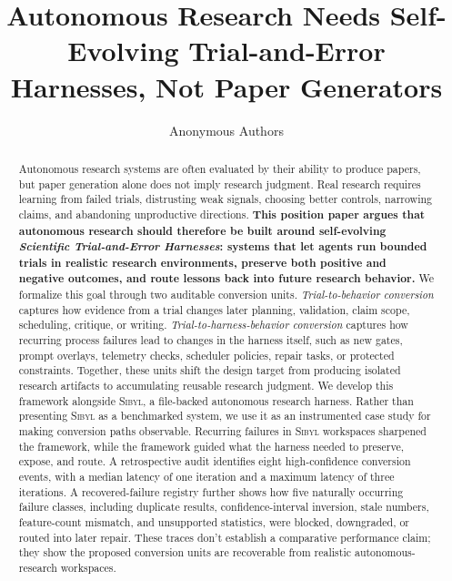 \documentclass{article}
\title{Autonomous Research Needs Self-Evolving Trial-and-Error Harnesses, Not Paper Generators}
\author{Anonymous Authors}
\newcommand{\sibyl}{\textsc{Sibyl}}
\begin{document}
\maketitle

\begin{abstract}
Autonomous research systems are often evaluated by their ability to produce papers, but paper generation alone does not imply research judgment. Real research requires learning from failed trials, distrusting weak signals, choosing better controls, narrowing claims, and abandoning unproductive directions. \textbf{This position paper argues that autonomous research should therefore be built around self-evolving \emph{Scientific Trial-and-Error Harnesses}: systems that let agents run bounded trials in realistic research environments, preserve both positive and negative outcomes, and route lessons back into future research behavior.}
We formalize this goal through two auditable conversion units. \emph{Trial-to-behavior conversion} captures how evidence from a trial changes later planning, validation, claim scope, scheduling, critique, or writing. \emph{Trial-to-harness-behavior conversion} captures how recurring process failures lead to changes in the harness itself, such as new gates, prompt overlays, telemetry checks, scheduler policies, repair tasks, or protected constraints. Together, these units shift the design target from producing isolated research artifacts to accumulating reusable research judgment.
We develop this framework alongside \sibyl{}, a file-backed autonomous research harness. Rather than presenting \sibyl{} as a benchmarked system, we use it as an instrumented case study for making conversion paths observable. Recurring failures in \sibyl{} workspaces sharpened the framework, while the framework guided what the harness needed to preserve, expose, and route. A retrospective audit identifies eight high-confidence conversion events, with a median latency of one iteration and a maximum latency of three iterations. A recovered-failure registry further shows how five naturally occurring failure classes, including duplicate results, confidence-interval inversion, stale numbers, feature-count mismatch, and unsupported statistics, were blocked, downgraded, or routed into later repair. These traces don't establish a comparative performance claim; they show the proposed conversion units are recoverable from realistic autonomous-research workspaces.
 
\end{abstract}
\end{document}
